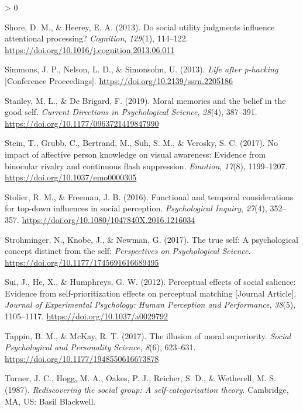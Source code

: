 \documentclass[
  english,
  man]{apa6}
\newlength{\cslhangindent}
\newenvironment{CSLReferences}[2] %
 {%
  \setlength{\parindent}{0pt}
  \ifodd #1 \everypar{\setlength{\hangindent}{\cslhangindent}}\ignorespaces\fi
  \ifnum #2 > 0
  \setlength{\parskip}{#2\baselineskip}
  \fi
 }%
 {}
\begin{document}
\begin{CSLReferences}{1}{0}
\leavevmode\hypertarget{ref-shore_social_2013}{}%
Shore, D. M., \& Heerey, E. A. (2013). Do social utility judgments influence attentional processing? \emph{Cognition}, \emph{129}(1), 114--122. \url{https://doi.org/10.1016/j.cognition.2013.06.011}

\leavevmode\hypertarget{ref-Simmons_2013_life}{}%
Simmons, J. P., Nelson, L. D., \& Simonsohn, U. (2013). \emph{Life after p-hacking} {[}Conference Proceedings{]}. \url{https://doi.org/10.2139/ssrn.2205186}

\leavevmode\hypertarget{ref-stanley_moral_2019}{}%
Stanley, M. L., \& De Brigard, F. (2019). Moral memories and the belief in the good self. \emph{Current Directions in Psychological Science}, \emph{28}(4), 387--391. \url{https://doi.org/10.1177/0963721419847990}

\leavevmode\hypertarget{ref-stein_no_2017}{}%
Stein, T., Grubb, C., Bertrand, M., Suh, S. M., \& Verosky, S. C. (2017). No impact of affective person knowledge on visual awareness: Evidence from binocular rivalry and continuous flash suppression. \emph{Emotion}, \emph{17}(8), 1199--1207. \url{https://doi.org/10.1037/emo0000305}

\leavevmode\hypertarget{ref-stolier_functional_2016}{}%
Stolier, R. M., \& Freeman, J. B. (2016). Functional and temporal considerations for top-down influences in social perception. \emph{Psychological Inquiry}, \emph{27}(4), 352--357. \url{https://doi.org/10.1080/1047840X.2016.1216034}

\leavevmode\hypertarget{ref-strohminger_true_2017}{}%
Strohminger, N., Knobe, J., \& Newman, G. (2017). The true self: A psychological concept distinct from the self: \emph{Perspectives on Psychological Science}. \url{https://doi.org/10.1177/1745691616689495}

\leavevmode\hypertarget{ref-Sui_2012_JEPHPP}{}%
Sui, J., He, X., \& Humphreys, G. W. (2012). Perceptual effects of social salience: Evidence from self-prioritization effects on perceptual matching {[}Journal Article{]}. \emph{Journal of Experimental Psychology: Human Perception and Performance}, \emph{38}(5), 1105--1117. \url{https://doi.org/10.1037/a0029792}

\leavevmode\hypertarget{ref-tappin_illusion_2017}{}%
Tappin, B. M., \& McKay, R. T. (2017). The illusion of moral superiority. \emph{Social Psychological and Personality Science}, \emph{8}(6), 623--631. \url{https://doi.org/10.1177/1948550616673878}

\leavevmode\hypertarget{ref-turner_rediscovering_1987}{}%
Turner, J. C., Hogg, M. A., Oakes, P. J., Reicher, S. D., \& Wetherell, M. S. (1987). \emph{Rediscovering the social group: A self-categorization theory}. Cambridge, {MA}, {US}: Basil Blackwell.


\end{CSLReferences}
\end{document}
